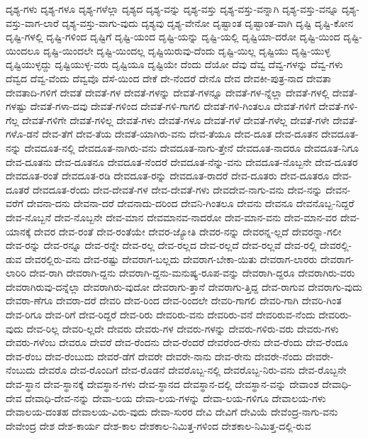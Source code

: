 {ದೃಶ್ಯ-ಗಳು
ದೃಶ್ಯ-ಗಳೂ
ದೃಶ್ಯ-ಗಳೆಲ್ಲಾ
ದೃಶ್ಯದ
ದೃಶ್ಯ-ವನ್ನು
ದೃಶ್ಯ-ವಸ್ತು
ದೃಶ್ಯ-ವಸ್ತು-ವನ್ನಾಗಿ
ದೃಶ್ಯ-ವಸ್ತು-ವನ್ನೂ
ದೃಶ್ಯ-ವಸ್ತು-ವಾಗ-ಲಾರೆ
ದೃಶ್ಯ-ವಸ್ತು-ವಾಗು-ವುದು
ದೃಶ್ಯವು
ದೃಶ್ಯ-ವೇನೋ
ದೃಷ್ಟಾಂತ
ದೃಷ್ಟಾಂತ-ವಾಗಿ
ದೃಷ್ಟಿ
ದೃಷ್ಟಿ-ಕೋನ
ದೃಷ್ಟಿ-ಗಳಲ್ಲಿ
ದೃಷ್ಟಿ-ಗಳಿಂದ
ದೃಷ್ಟಿಗೆ
ದೃಷ್ಟಿ-ಯಂದ
ದೃಷ್ಟಿ-ಯನ್ನು
ದೃಷ್ಟಿ-ಯಲ್ಲಿ
ದೃಷ್ಟಿಯಾ-ದರೋ
ದೃಷ್ಟಿ-ಯಿಂದ
ದೃಷ್ಟಿ-ಯಿಂದಲೂ
ದೃಷ್ಟಿ-ಯಿಂದಲೇ
ದೃಷ್ಟಿ-ಯಿಂದಲ್ಲ
ದೃಷ್ಟಿಯಿರುವು-ದೆಂದು
ದೃಷ್ಟಿ-ಯಿಲ್ಲ
ದೃಷ್ಟಿಯು
ದೃಷ್ಟಿ-ಯುಳ್ಳ
ದೃಷ್ಟಿಯುಳ್ಳದ್ದು
ದೃಷ್ಟಿಯುಳ್ಳ-ವರು
ದೃಷ್ಟಿಯೂ
ದೃಷ್ಟಿಯೇ
ದೆಂದು
ದೆಯೋ
ದೆವು
ದೆವ್ವ
ದೆವ್ವ-ಗಳನ್ನು
ದೆವ್ವ-ಗಳು
ದೆವ್ವದ
ದೆವ್ವ-ವೆಂದು
ದೆವ್ವವೊ
ದೆಸೆ-ಯಿಂದ
ದೇಕೆ
ದೇ-ನೆಂದರೆ
ದೇನೊ
ದೇವ
ದೇವಕೀ-ಪುತ್ರ-ನಾದ
ದೇವತಾ
ದೇವತಾದಿ-ಗಳಿಗೆ
ದೇವತೆ
ದೇವತೆ-ಗಳ
ದೇವತೆ-ಗಳನ್ನು
ದೇವತೆ-ಗಳನ್ನೂ
ದೇವತೆ-ಗಳ-ನ್ನೆಲ್ಲಾ
ದೇವತೆ-ಗಳಲ್ಲಿ
ದೇವತೆ-ಗಳಷ್ಟು
ದೇವತೆ-ಗಳಾ-ದವು
ದೇವತೆ-ಗಳಿಂದ
ದೇವತೆ-ಗಳಿ-ಗಾಗಲಿ
ದೇವತೆ-ಗಳಿ-ಗಿಂತಲೂ
ದೇವತೆ-ಗಳಿಗೆ
ದೇವತೆ-ಗಳಿ-ಗೆಲ್ಲ
ದೇವತೆ-ಗಳಿಗೇ
ದೇವತೆ-ಗಳಿಲ್ಲ
ದೇವತೆ-ಗಳು
ದೇವತೆ-ಗಳೂ
ದೇವತೆ-ಗಳೆ
ದೇವತೆ-ಗಳೆಲ್ಲ
ದೇವತೆ-ಗಳೇ
ದೇವತೆ-ಗಳೊ-ಡನೆ
ದೇವ-ತೆಗೆ
ದೇವ-ತೆಯ
ದೇವತೆ-ಯಾಗಿರು-ವನು
ದೇವ-ತೆಯೂ
ದೇವ-ದೂತ
ದೇವ-ದೂತನ
ದೇವದೂತ-ನನ್ನು
ದೇವದೂತ-ನಲ್ಲಿ
ದೇವದೂತ-ನಾಗಿರು-ವನು
ದೇವದೂತ-ನಾಗು-ತ್ತೇನೆ
ದೇವದೂತ-ನಾದರೂ
ದೇವದೂತ-ನಿಗೂ
ದೇವ-ದೂತನು
ದೇವ-ದೂತನೂ
ದೇವದೂತ-ನೆಂದರೆ
ದೇವದೂತ-ನೆನ್ನು-ವನು
ದೇವದೂತ-ನೊಬ್ಬನೇ
ದೇವ-ದೂತರ
ದೇವದೂತ-ರಂತೆ
ದೇವದೂತ-ರಡಿ
ದೇವದೂತ-ರನ್ನು
ದೇವದೂತ-ರಾದರೆ
ದೇವ-ದೂತರು
ದೇವ-ದೂತರೂ
ದೇವ-ದೂತರೆ
ದೇವದೂತ-ರೆಂದು
ದೇವ-ದೇವತೆ-ಗಳ
ದೇವ-ದೇವತೆ-ಗಳು
ದೇವದೇವ-ನಾಗು-ವನು
ದೇವ-ನನ್ನು
ದೇವನ-ವರೆಗೆ
ದೇವನಾ-ದನು
ದೇವನಾ-ದರೆ
ದೇವನಾದು-ದರಿಂದ
ದೇವನಿ-ಗಿಂತಲೂ
ದೇವನು
ದೇವನೂ
ದೇವನೊಬ್ಬ-ನಿದ್ದರೆ
ದೇವ-ನೊಬ್ಬನೆ
ದೇವ-ನೊಬ್ಬನೇ
ದೇವ-ಮಾನ
ದೇವಮಾನವ-ನಾದರೋ
ದೇವ-ಮಾನ-ವನು
ದೇವ-ಮಾನ-ವರ
ದೇವ-ಯಾನಕ್ಕೆ
ದೇವರ
ದೇವ-ರಂತೆ
ದೇವ-ರಂತೆಯೇ
ದೇವರ-ಜ್ಯೋತಿ
ದೇವರ-ನನ್ನು
ದೇವರನ್ನ-ಲ್ಲದೆ
ದೇವರನ್ನಾ-ಗಲೀ
ದೇವ-ರನ್ನು
ದೇವ-ರನ್ನೂ
ದೇವ-ರನ್ನೇ
ದೇವ-ರಲ್ಲ
ದೇವ-ರಲ್ಲದ
ದೇವ-ರಲ್ಲದೆ
ದೇವ-ರಲ್ಲವೆ
ದೇವ-ರಲ್ಲಿ
ದೇವರಲ್ಲಿ-ಡುವ
ದೇವರಲ್ಲಿರು-ವನು
ದೇವ-ರಷ್ಟು
ದೇವರಾಗ-ಬಲ್ಲದು
ದೇವರಾಗ-ಬೇಕಾ-ಯಿತು
ದೇವರಾಗ-ಲಾರರು
ದೇವರಾಗ-ಲಾರಿರಿ
ದೇವ-ರಾಗಿ
ದೇವರಾಗಿ-ದ್ದನು
ದೇವರಾಗಿ-ದ್ದನು-ಮನುಷ್ಯ-ರೂಪ-ವನ್ನು
ದೇವರಾಗಿ-ದ್ದರೂ
ದೇವರಾಗಿರು-ವರು
ದೇವರಾಗಿರುವು-ದನ್ನೆಲ್ಲಾ
ದೇವರಾಗಿರು-ವುದೋ
ದೇವರಾಗು-ತ್ತಾನೆ
ದೇವರಾಗು-ತ್ತಿದ್ದ
ದೇವ-ರಾಗುವ
ದೇವರಾಗು-ವುದು
ದೇವರಾ-ಣೆಗೂ
ದೇವರಾ-ದರೆ
ದೇವರಿ
ದೇವ-ರಿಂದ
ದೇವ-ರಿಂದಲೇ
ದೇವರಿ-ಗಾಗಲಿ
ದೇವರಿ-ಗಾಗಿ
ದೇವರಿ-ಗಿಂತ
ದೇವ-ರಿಗೂ
ದೇವ-ರಿಗೆ
ದೇವ-ರಿದ್ದರೆ
ದೇವ-ರಿರು
ದೇವರಿರು-ವನು
ದೇವರಿರು-ವನೆ
ದೇವರಿರುವ-ನೆಂದು
ದೇವರಿರು-ವುದು
ದೇವ-ರಿಲ್ಲ
ದೇವರಿ-ಲ್ಲದೇ
ದೇವರು
ದೇವರು-ಗಳ
ದೇವರು-ಗಳನ್ನು
ದೇವರು-ಗಳಿರು-ವರು
ದೇವರು-ಗಳು
ದೇವರು-ಗಳೆಂಬ
ದೇವರೂ
ದೇವರೆ
ದೇವ-ರೆಂದನು
ದೇವ-ರೆಂದರೆ
ದೇವರೆಂದ-ರೇನು
ದೇವ-ರೆಂದು
ದೇವ-ರೆಂದೂ
ದೇವ-ರೆಂಬ
ದೇವ-ರೆಂಬುದು
ದೇವರೆ-ಡೆಗೆ
ದೇವರೇ
ದೇವರೇ-ನಾನು
ದೇವ-ರೇನು
ದೇವರೇ-ನೆಂದು
ದೇವರೇ-ನೆಂಬುದು
ದೇವರೊ
ದೇವ-ರೊಂದಿಗೆ
ದೇವ-ರೊಡನೆ
ದೇವರೊಬ್ಬ-ನಲ್ಲಿ
ದೇವರೊಬ್ಬ-ನಿರು-ವನು
ದೇವ-ರೊಬ್ಬನೇ
ದೇವ-ಸ್ಥಾನ
ದೇವ-ಸ್ಥಾನಕ್ಕೆ
ದೇವಸ್ಥಾನ-ಗಳು
ದೇವ-ಸ್ಥಾನದ
ದೇವಸ್ಥಾನ-ದಲ್ಲಿ
ದೇವಸ್ಥಾನ-ವನ್ನು
ದೇವಾಂಶ
ದೇವಾಧಿ-ದೇವ
ದೇವಾಧಿ-ದೇವ-ನನ್ನು
ದೇವಾ-ಲಯ
ದೇವಾ-ಲಯ-ಗಳನ್ನು
ದೇವಾ-ಲಯ-ಗಳಿಗೂ
ದೇವಾಲಯ-ಗಳು
ದೇವಾಲಯ-ದಂತಹ
ದೇವಾಲಯ-ವಿರು-ವುದು
ದೇವಾ-ಸುರರ
ದೇವಿ
ದೇವಿಗೆ
ದೇವಿಯೆ
ದೇವೆಂದ್ರ-ನಾಗು-ವನು
ದೇವೇಂದ್ರ
ದೇಶ
ದೇಶ-ಕಾರ್ಯ
ದೇಶ-ಕಾಲ
ದೇಶಕಾಲ-ನಿಮಿತ್ತ-ಗಳಿಂದ
ದೇಶಕಾಲ-ನಿಮಿತ್ತ-ದಲ್ಲಿ-ರುವ
}
